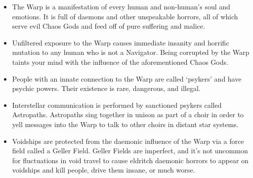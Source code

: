 \documentclass[10pt,a4paper]{article}
\begin{document}
\begin{multicols}{2}
\begin{itemize}
  \item The Warp is a manifestation of every human and non-human’s soul and emotions. It is full of daemons and other unspeakable horrors, all of which serve evil Chaos Gods and feed off of pure suffering and malice.
  \item Unfiltered exposure to the Warp causes immediate insanity and horrific mutation to any human who is not a Navigator. Being corrupted by the Warp taints your mind with the influence of the aforementioned Chaos Gods.
  \item People with an innate connection to the Warp are called ‘psykers’ and have psychic powers. Their existence is rare, dangerous, and illegal.
  \item Interstellar communication is performed by sanctioned psykers called Astropaths. Astropaths sing together in unison as part of a choir in order to yell messages into the Warp to talk to other choirs in distant star systems. 
  \item Voidships are protected from the daemonic influence of the Warp via a force field called a Geller Field. Geller Fields are imperfect, and it’s not uncommon for fluctuations in void travel to cause eldritch daemonic horrors to appear on voidships and kill people, drive them insane, or much worse.
\end{itemize}


\end{multicols}
\end{document}
